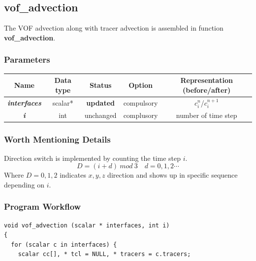 \documentclass[a4paper]{article}
\newcommand{\func}[1]{\textbf{\textcolor{function}{#1}}}
\newcommand{\para}[1]{\textbf{\emph{\textcolor{para}{#1}}}}
\begin{document}
\subsection{\func{vof\_advection}}
The VOF advection along with tracer advection is assembled in function \func{vof\_advection}.
\subsubsection{Parameters}
\begin{table}[h]
  \centering
  \begin{tabular}{|c|c|c|c|c|}
    \hline
    Name & Data type & Status & Option & Representation (before/after)\\[0.5ex]
    \hline\hline
    \rowcolor{output} \para{interfaces} & scalar* & \textbf{updated} & compulsory & $c_i^n$/$c_i^{n+1}$\\
    \hline
    \para{i} & int & unchanged & complusory & number of time step\\
    \hline
  \end{tabular}
\end{table}
\subsubsection{Worth Mentioning Details}
Direction switch is implemented by counting the time step $i$. 
\begin{equation}
    D = (i+d)\ mod \ 3 \quad d = 0,1,2\cdots
\end{equation}
Where $D = 0,1,2$ indicates $x,y,z$ direction and shows up in specific sequence depending on $i$.

\subsubsection{Program Workflow}

\begin{multicols}{2}
 \columnbreak
 \begin{verbatim}
void vof_advection (scalar * interfaces, int i)
{
  for (scalar c in interfaces) {
    scalar cc[], * tcl = NULL, * tracers = c.tracers; 
 \end{verbatim}
\end{multicols}
\end{document}

